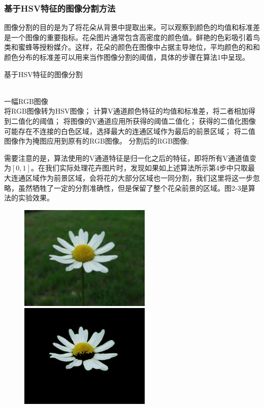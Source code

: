 \documentclass[supercite]{HustGraduPaper}
\begin{document}
\begin{sloppypar}
  \subsubsection{基于HSV特征的图像分割方法}
  图像分割的目的是为了将花朵从背景中提取出来。可以观察到颜色的均值和标准差是一个图像的重要指标\cite{t1}。花朵图片通常包含高密度的颜色值。鲜艳的色彩吸引着鸟类和蜜蜂等授粉媒介。这样，花朵的颜色在图像中占据主导地位，平均颜色的和和颜色分布的标准差可以用来当作图像分割的阈值，具体的步骤在算法1中呈现。
  \begin{algorithm}[H] 
    \caption{基于HSV特征的图像分割} 
    \label{alg:Framwork} 
    \begin{algorithmic}[1] %
    \REQUIRE ~~\\ %
    一幅RGB图像\\
    \STATE 将RGB图像转为HSV图像；
    \STATE 计算V通道颜色特征的均值和标准差，将二者相加得到二值化的阈值；
    \STATE 将图像的V通道应用所获得的阈值二值化；
    \STATE 获得的二值化图像可能存在不连接的白色区域，选择最大的连通区域作为最后的前景区域；
    \STATE 将二值图像作为掩图应用到原有的RGB图像。
    \RETURN 分割后的RGB图像; %
    \end{algorithmic}
  \end{algorithm}
  需要注意的是，算法使用的V通道特征是归一化之后的特征，即将所有V通道值变为$[0,1]$。在我们实际处理花卉图片时，发现如果如上述算法所示第4步中只取最大连通区域作为前景区域，会将花的大部分区域也一同分割，我们这里将这一步忽略，虽然牺牲了一定的分割准确性，但是保留了整个花朵前景的区域。图2-3是算法的实验效果。
  \begin{figure}[H]
    \setlength{\abovecaptionskip}{0.2cm}
    \setlength{\belowcaptionskip}{-0.2cm}
    \centering%
      {\includegraphics[height=5cm]{4.jpg}}%
    \hspace{2em}%
        {\includegraphics[height=5cm]{5.jpg}}
  

\end{figure}
\end{sloppypar}
\end{document}
